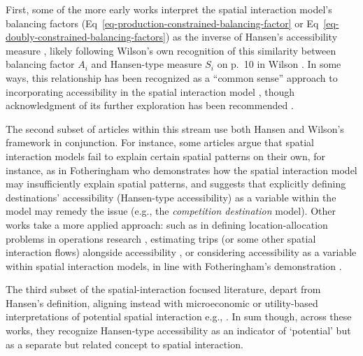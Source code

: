 \documentclass[
  10pt,
  letterpaper,
]{article}
\begin{document}
First, some of the more early works interpret the spatial interaction
model's balancing factors
(Eq~\ref{eq-production-constrained-balancing-factor} or
Eq~\ref{eq-doubly-constrained-balancing-factors}) as the inverse of
Hansen's accessibility measure
\citep{harrisEquilibriumValuesDynamics1978, leonardiOptimumFacilityLocation1978, fotheringhamSPATIALSTRUCTUREDISTANCE1981, fotheringhamSpatialCompetitionAgglomeration1985},
likely following Wilson's own recognition of this similarity between
balancing factor \(A_i\) and Hansen-type measure \(S_i\) on p.~10 in
Wilson \citep{wilson1971}. In some ways, this relationship has been
recognized as a ``common sense'' approach to incorporating accessibility
in the spatial interaction model
\citep[p.~99]{morrisAccessibilityIndicatorsTransport1979}, though
acknowledgment of its further exploration has been recommended
\citep{battyMethodResiduesUrban1976}.

The second subset of articles within this stream use both Hansen
\citep{hansen1959} and Wilson's \citep{wilson1971} framework in
conjunction. For instance, some articles argue that spatial interaction
models fail to explain certain spatial patterns on their own, for
instance, as in Fotheringham
\citep{fotheringhamSpatialCompetitionAgglomeration1985} who demonstrates
how the spatial interaction model may insufficiently explain spatial
patterns, and suggests that explicitly defining destinations'
accessibility (Hansen-type accessibility) as a variable within the model
may remedy the issue (e.g., the \emph{competition destination} model).
Other works take a more applied approach: such as in defining
location-allocation problems in operations research
\citep{leonardiOptimumFacilityLocation1978, beaumontLocationallocationProblemsPlane1981},
estimating trips (or some other spatial interaction flows) alongside
accessibility
\citep[e.g.,][]{clarke2002deriving, grengs2004measuring, turk2019socio},
or considering accessibility as a variable within spatial interaction
models, in line with Fotheringham's
\citep{fotheringhamSpatialCompetitionAgglomeration1985} demonstration
\citep[e.g.,][]{beckers2022incorporating}.

The third subset of the spatial-interaction focused literature, depart
from Hansen's \citep{hansen1959} definition, aligning instead with
microeconomic or utility-based interpretations of potential spatial
interaction e.g.,
\citep{morrisAccessibilityIndicatorsTransport1979, leonardiRandomUtilityDemand1984}.
In sum though, across these works, they recognize Hansen-type
accessibility as an indicator of `potential' but as a separate but
related concept to spatial interaction.
\end{document}
